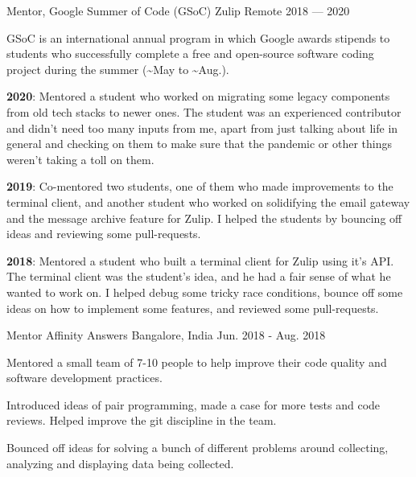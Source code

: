 
\begin{cventries}

  \cventry
      {Mentor, Google Summer of Code (GSoC)}
      {Zulip}
      {Remote} %
      {2018 --- 2020} %
      {
        \begin{cvitems} %
        \item {GSoC is an international annual program in which Google awards stipends to students who successfully complete a free and open-source software coding project during the summer (\textasciitilde May to \textasciitilde Aug.).}
        \item {\textbf{2020}: Mentored a student who worked on migrating some legacy components from old tech stacks to newer ones. The student was an experienced contributor and didn't need too many inputs from me, apart from just talking about life in general and checking on them to make sure that the pandemic or other things weren't taking a toll on them.}
        \item {\textbf{2019}: Co-mentored two students, one of them who made improvements to the terminal client, and another student who worked on solidifying the email gateway and the message archive feature for Zulip. I helped the students by bouncing off ideas and reviewing some pull-requests.}
        \item {\textbf{2018}: Mentored a student who built a terminal client for Zulip using it's API. The terminal client was the student's idea, and he had a fair sense of what he wanted to work on. I helped debug some tricky race conditions, bounce off some ideas on how to implement some features, and reviewed some pull-requests.}
        \end{cvitems}
      }
  \cventry
      {Mentor}
      {Affinity Answers}
      {Bangalore, India} %
      {Jun. 2018 - Aug. 2018} %
      {
        \begin{cvitems} %
        \item {Mentored a small team of 7-10 people to help improve their code quality and software development practices.}
        \item {Introduced ideas of pair programming, made a case for more tests and code reviews. Helped improve the git discipline in the team.}
        \item {Bounced off ideas for solving a bunch of different problems around collecting, analyzing and displaying data being collected.}
        \end{cvitems}
      }
\end{cventries}
